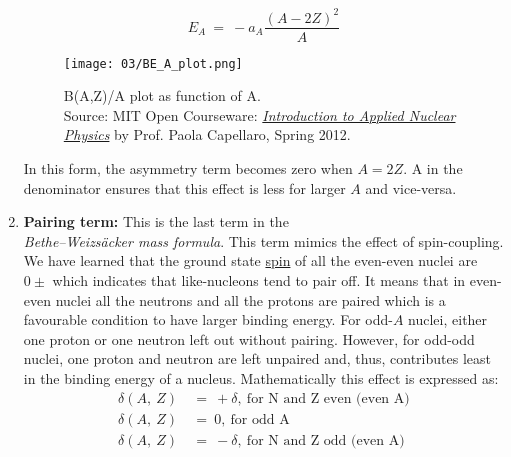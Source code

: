 \begin{enumerate}[label=\textbf{\Alph*.}]
        \begin{equation}
            E_A~=~-a_A\frac{(A-2Z)^2}{A}
        \end{equation}
        
        
        \begin{figure}
        \centering
            \texttt{[image: 03/BE\_A\_plot.png]}
            \caption{B(A,Z)/A plot as function of A.\\Source: MIT Open Courseware: \href{https://ocw.mit.edu/courses/nuclear-engineering/22-02-introduction-to-applied-nuclear-physics-spring-2012/}{\textit{Introduction to Applied Nuclear Physics}} by Prof. Paola Capellaro, Spring 2012.}
            \label{fig:plot_BE_A}
        \end{figure}
        
        \par In this form, the asymmetry term becomes zero when $A = 2Z$. A in the denominator ensures that this effect is less for larger $A$ and vice-versa.
        
    \item \textbf{Pairing term:}    This is the last term in the\\\textit{Bethe–Weizsäcker mass formula}. This term mimics the effect of spin-coupling. We have learned that the ground state \href{https://en.wikipedia.org/wiki/Spin_(physics)}{spin} of all the even-even nuclei are {$0\pm$} which indicates that like-nucleons tend to pair off. It means that in even-even nuclei all the neutrons and all the protons are paired which is a favourable condition to have larger binding energy. For odd-$A$ nuclei, either one proton or one neutron left out without pairing. However, for odd-odd nuclei, one proton and neutron are left unpaired and, thus, contributes least in the binding energy of a nucleus. Mathematically this effect is expressed as:
        \begin{equation}
            \begin{split}
                \delta(A,~Z)~&=~+\delta,~ \textrm       {for N and Z even (even A)}\\
                \delta(A,~Z)~&=~0,~ \textrm             {for odd A}\\
                \delta(A,~Z)~&=~-\delta,~ \textrm       {for N and Z odd (even A)}\\
            \end{split}
        \end{equation}
        

\end{enumerate}
